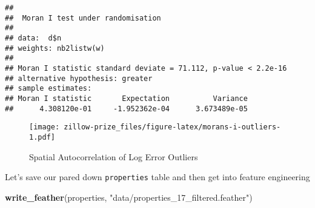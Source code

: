 \documentclass[]{book}
\newenvironment{Shaded}{\begin{snugshade}}{\end{snugshade}}
\newcommand{\KeywordTok}[1]{\textcolor[rgb]{0.13,0.29,0.53}{\textbf{#1}}}
\newcommand{\DataTypeTok}[1]{\textcolor[rgb]{0.13,0.29,0.53}{#1}}
\newcommand{\StringTok}[1]{\textcolor[rgb]{0.31,0.60,0.02}{#1}}
\newcommand{\OperatorTok}[1]{\textcolor[rgb]{0.81,0.36,0.00}{\textbf{#1}}}
\newcommand{\NormalTok}[1]{#1}
\theoremstyle{definition}
\theoremstyle{definition}
\theoremstyle{definition}
\theoremstyle{remark}
\begin{document}
\begin{verbatim}
## 
##  Moran I test under randomisation
## 
## data:  d$n  
## weights: nb2listw(w)    
## 
## Moran I statistic standard deviate = 71.112, p-value < 2.2e-16
## alternative hypothesis: greater
## sample estimates:
## Moran I statistic       Expectation          Variance 
##      4.308120e-01     -1.952362e-04      3.673489e-05
\end{verbatim}

\begin{Shaded}
\end{Shaded}

\begin{figure}
\centering
\texttt{[image: zillow-prize\_files/figure-latex/morans-i-outliers-1.pdf]}
\caption{\label{fig:morans-i-outliers}Spatial Autocorrelation of Log Error
Outliers}
\end{figure}

Let's save our pared down \texttt{properties} table and then get into
feature engineering

\begin{Shaded}
\begin{Highlighting}[]
\KeywordTok{write_feather}\NormalTok{(properties, }\StringTok{"data/properties_17_filtered.feather"}\NormalTok{)}
\end{Highlighting}
\end{Shaded}
\end{document}
